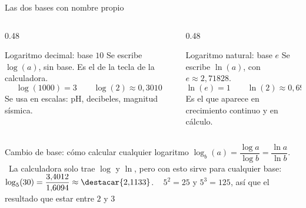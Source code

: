 \documentclass[aspectratio=169,10pt]{beamer}
\begin{document}
\begin{frame}{Las dos bases con nombre propio}
  \scriptsize
  \begin{columns}[T,onlytextwidth]
    \begin{column}{0.48\textwidth}
      \begin{block}{Logaritmo decimal: base $10$}
        \tiny
        Se escribe $\log(a)$, sin base. Es el de la tecla  de la
        calculadora.
        \[ \log(1000)=3 \qquad \log(2)\approx 0{,}3010 \]
        Se usa en escalas: pH, decibeles, magnitud sísmica.
      \end{block}
    \end{column}
    \begin{column}{0.48\textwidth}
      \begin{block}{Logaritmo natural: base $e$}
        \tiny
        Se escribe $\ln(a)$, con $e\approx 2{,}71828$.
        \[ \ln(e)=1 \qquad \ln(2)\approx 0{,}6931 \]
        Es el que aparece en crecimiento continuo y en cálculo.
      \end{block}
    \end{column}
  \end{columns}

  \vspace{0.02cm}
  \begin{exampleblock}{Cambio de base: cómo calcular cualquier logaritmo}
    \tiny
    $\log_{b}(a) = \dfrac{\log a}{\log b} = \dfrac{\ln a}{\ln b}$. \ La
    calculadora solo trae $\log$ y $\ln$, pero con esto sirve para cualquier
    base: \ $\log_{5}(30) = \dfrac{3{,}4012}{1{,}6094}
    \approx \destacar{2{,}1133}$.
    \  $5^{2}=25$ y $5^{3}=125$, así que el resultado
     que estar entre $2$ y $3$ \checkmark
  \end{exampleblock}
\end{frame}
\end{document}

